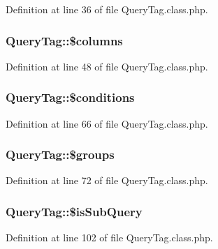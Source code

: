 Definition at line 36 of file Query\+Tag.\+class.\+php.

\hypertarget{classQueryTag_a375d57839b60d616ed27af9f42acd3a1}{}
\subsubsection[{\$columns}]{\setlength{\rightskip}{0pt plus 5cm}Query\+Tag\+::\$columns}\label{classQueryTag_a375d57839b60d616ed27af9f42acd3a1}


Definition at line 48 of file Query\+Tag.\+class.\+php.

\hypertarget{classQueryTag_a7cf9adc98dec4da0e67c1dcd25b7e5b5}{}
\subsubsection[{\$conditions}]{\setlength{\rightskip}{0pt plus 5cm}Query\+Tag\+::\$conditions}\label{classQueryTag_a7cf9adc98dec4da0e67c1dcd25b7e5b5}


Definition at line 66 of file Query\+Tag.\+class.\+php.

\hypertarget{classQueryTag_aa456465c5358ae400751727cd943683e}{}
\subsubsection[{\$groups}]{\setlength{\rightskip}{0pt plus 5cm}Query\+Tag\+::\$groups}\label{classQueryTag_aa456465c5358ae400751727cd943683e}


Definition at line 72 of file Query\+Tag.\+class.\+php.

\hypertarget{classQueryTag_ac657cdbbef0ca8f1907197cbf91f1040}{}
\subsubsection[{\$is\+Sub\+Query}]{\setlength{\rightskip}{0pt plus 5cm}Query\+Tag\+::\$is\+Sub\+Query}\label{classQueryTag_ac657cdbbef0ca8f1907197cbf91f1040}


Definition at line 102 of file Query\+Tag.\+class.\+php.


